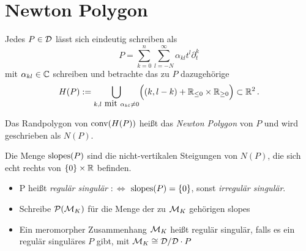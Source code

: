 \section{Newton Polygon} %
Jedes $P\in \mathcal{D}$ lässt sich eindeutig schreiben als
\[ P=\sum^{n}_{k=0}{\sum^{\infty}_{l=-N}{\alpha_{kl}t^l\partial_t^k}} \]
mit $\alpha_{kl}\in\mathbb{C}$ schreiben und betrachte das zu $P$ dazugehörige
\[ H(P):=\underset{k,l\mbox{ mit }\alpha_{kl}\neq0}{\bigcup}\Big( (k,l-k) +
\mathbb{R}_{\leq 0}\times \mathbb{R}_{\geq 0} \Big) \subset \mathbb{R}^2 \,. \]
\begin{comment}
Bei Sabbah: $H\subset \N\times\Z$ und dann konvexe Hülle davon in $\R^2$
\end{comment}

\begin{defn} %
Das Randpolygon von $\operatorname{conv}(H(P))$ heißt das \emph{Newton Polygon} von $P$ und
wird geschrieben als $N(P)$.
\end{defn}

\begin{defn} %
Die Menge $\operatorname{slopes}(P)$ sind die nicht-vertikalen Steigungen von $N(P)$, die
sich echt rechts von $\{0\}\times\mathbb{R}$ befinden.\\ %
\begin{itemize}
\item P heißt \emph{regulär singulär} $:\Leftrightarrow$
$\operatorname{slopes}(P)=\{0\}$, sonst \emph{irregulär singulär}.
\item Schreibe $\mathcal{P}(\mathcal{M}_K)$ für die Menge der zu $\mathcal{M}_K$ gehörigen slopes
\item Ein meromorpher Zusammenhang $\mathcal{M}_K$ heißt regulär singulär, falls es
ein regulär singuläres $P$ gibt, mit $\mathcal{M}_K\cong\mathcal{D}/\mathcal{D}\cdot P$
\end{itemize}
\end{defn}

